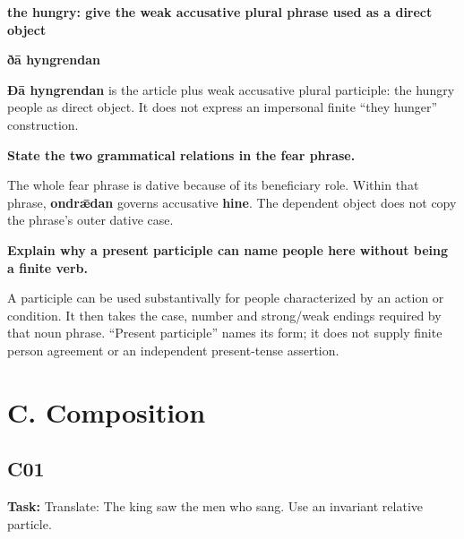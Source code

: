 \textbf{the hungry: give the weak accusative plural phrase used as a direct object}

\textbf{ðā hyngrendan}

\textbf{Ðā hyngrendan} is the article plus weak accusative plural participle: the hungry people as direct object. It does not express an impersonal finite “they hunger” construction.

\textbf{State the two grammatical relations in the fear phrase.}

The whole fear phrase is dative because of its beneficiary role. Within that phrase, \textbf{ondrǣdan} governs accusative \textbf{hine}. The dependent object does not copy the phrase's outer dative case.

\textbf{Explain why a present participle can name people here without being a finite verb.}

A participle can be used substantivally for people characterized by an action or condition. It then takes the case, number and strong/\allowbreak{}weak endings required by that noun phrase. “Present participle” names its form; it does not supply finite person agreement or an independent present-tense assertion.

\section*{C. Composition}

\subsection*{C01}

\textbf{Task:} Translate: The king saw the men who sang. Use an invariant relative particle.


